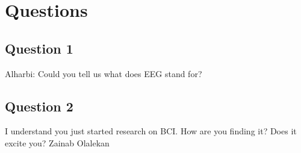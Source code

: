 %
\section{Questions}
\subsection{Question 1}
Alharbi: Could you tell us what does EEG stand for?

\subsection{Question 2}
I understand you just started research on BCI. How are you finding it? Does it excite you? Zainab Olalekan

